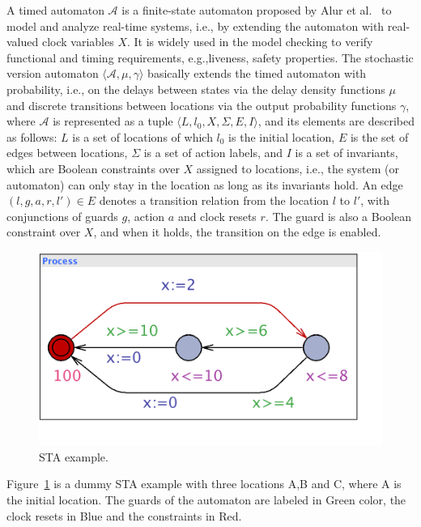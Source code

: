 A timed automaton $\mathcal{A}$ is a finite-state automaton proposed by Alur et al.~\cite{Alur1999TimedAutomata} to model and analyze real-time systems, i.e., by extending the automaton with real-valued clock variables $X$. It is widely used in the model checking to verify functional and timing requirements, e.g.,liveness, safety properties. The stochastic version automaton $\langle\mathcal{A},\mu,\gamma\rangle$ basically extends the timed automaton with probability, i.e., on the delays between states via the delay density functions $\mu$ and discrete transitions between locations via the output probability functions $\gamma$, where  $\mathcal{A}$ is represented as a tuple $\langle L,l_0,X,\Sigma,E,I\rangle$, and its elements are described as follows: $L$ is a set of locations of which $l_0$ is the initial location, $E$ is the set of edges between locations,  $\Sigma$ is a set of action labels, and $I$ is a set of invariants, which are Boolean constraints over $X$ assigned to locations, i.e., the system (or automaton) can only stay in the location as long as its invariants hold. An edge $(l,g,a,r,l')\in E$ denotes a transition relation from the location $l$ to $l'$, with conjunctions of guards $g$, action $a$ and clock resets $r$. The guard is also a Boolean constraint over $X$, and when it holds, the transition on the edge is enabled.
\begin{figure}
	\centering
	\includegraphics[width=0.6\linewidth]{images/sta_dummy_example}
	\caption{STA example.}
	\label{fig_staexample}
\end{figure}

\begin{example} Figure~\ref{fig_staexample} is a dummy STA example with three locations A,B and C, where A is the initial location. The guards of the automaton are labeled in Green color, the clock resets in Blue and the constraints in Red.
\end{example}

